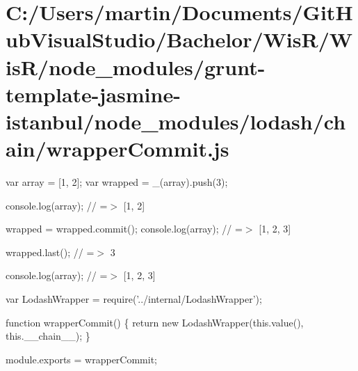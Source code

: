 \hypertarget{_c_1_2_users_2martin_2_documents_2_git_hub_visual_studio_2_bachelor_2_wis_r_2_wis_r_2node_module7999586b35221a27818d8ee0050c7edb}{}\section{C\+:/\+Users/martin/\+Documents/\+Git\+Hub\+Visual\+Studio/\+Bachelor/\+Wis\+R/\+Wis\+R/node\+\_\+modules/grunt-\/template-\/jasmine-\/istanbul/node\+\_\+modules/lodash/chain/wrapper\+Commit.\+js}
var array = \mbox{[}1, 2\mbox{]}; var wrapped = \+\_\+(array).push(3);

console.\+log(array); // =$>$ \mbox{[}1, 2\mbox{]}

wrapped = wrapped.\+commit(); console.\+log(array); // =$>$ \mbox{[}1, 2, 3\mbox{]}

wrapped.\+last(); // =$>$ 3

console.\+log(array); // =$>$ \mbox{[}1, 2, 3\mbox{]}


\begin{DoxyCodeInclude}
var LodashWrapper = require(\textcolor{stringliteral}{'../internal/LodashWrapper'});

\textcolor{keyword}{function} wrapperCommit() \{
  \textcolor{keywordflow}{return} \textcolor{keyword}{new} LodashWrapper(this.value(), this.\_\_chain\_\_);
\}

module.exports = wrapperCommit;
\end{DoxyCodeInclude}
 